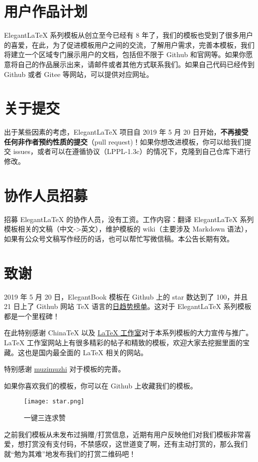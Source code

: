 \documentclass[cn,11pt]{elegantbook}
\begin{document}
\section{用户作品计划}
Elegant\LaTeX{} 系列模板从创立至今已经有 8 年了，我们的模板也受到了很多用户的喜爱，在此，为了促进模板用户之间的交流，了解用户需求，完善本模板，我们将建立一个区域专门展示用户的文档，包括但不限于 Github 和官网等。如果你愿意将自己的作品展示出来，请邮件或者其他方式联系我们。如果自己代码已经传到 Github 或者 Gitee 等网站，可以提供对应网址。

\section{关于提交}
出于某些因素的考虑，Elegant\LaTeX{} 项目自 2019 年 5 月 20 日开始，\textbf{不再接受任何非作者预约性质的提交}（pull request)！如果你想改进模板，你可以给我们提交 issues，或者可以在遵循协议（LPPL-1.3c）的情况下，克隆到自己仓库下进行修改。

\section{协作人员招募}
招募 Elegant\LaTeX{} 的协作人员，没有工资。工作内容：翻译 Elegant\LaTeX{} 系列模板相关的文稿（中文->英文），维护模板的 wiki（主要涉及 Markdown 语法），如果有公众号文稿写作经历的话，也可以帮忙写微信稿。本公告长期有效。

\section{致谢}
2019 年 5 月 20 日，ElegantBook 模板在 Github 上的 star 数达到了 100，并且 21 日上了 Github 网站 \TeX{} 语言的\href{https://github.com/trending/tex?since=daily}{日趋势榜单}。这对于 Elegant\LaTeX{} 系列模板都是一个里程碑！

在此特别感谢 China\TeX{} 以及 \href{http://www.latexstudio.net/}{\LaTeX{} 工作室}对于本系列模板的大力宣传与推广。\LaTeX{} 工作室网站上有很多精彩的帖子和精致的模板，欢迎大家去挖掘里面的宝藏。这也是国内最全面的 \LaTeX{} 相关的网站。

特别感谢 \href{https://github.com/muzimuzhi}{muzimuzhi} 对于模板的完善。

如果你喜欢我们的模板，你可以在 Github 上收藏我们的模板。
\begin{figure}[htbp]
\centering
\texttt{[image: star.png]}
\caption{一键三连求赞}
\end{figure}

之前我们模板从未发布过捐赠/打赏信息，近期有用户反映他们对我们模板非常喜爱，想打赏没有支付码，不禁感叹，这世道变了啊，还有主动打赏的，那么我们就“勉为其难”地发布我们的打赏二维码吧！
\end{document}
